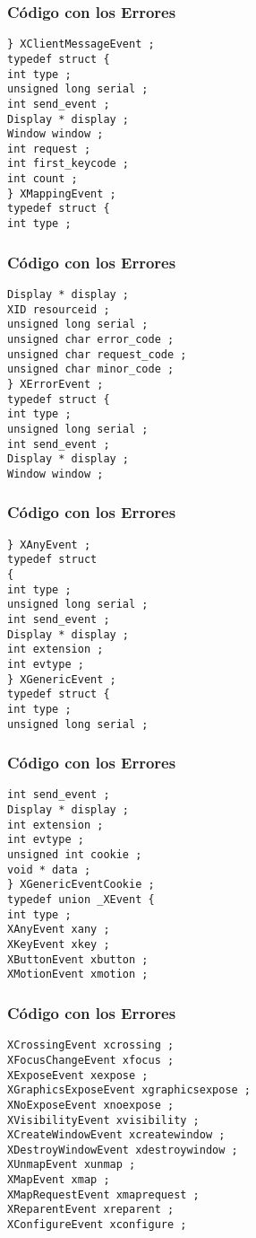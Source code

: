\documentclass{beamer}
\begin{document}
\begin{frame}[fragile]
\frametitle{C\'odigo con los Errores}
\begin{verbatim}
} XClientMessageEvent ; 
typedef struct { 
int type ; 
unsigned long serial ; 
int send_event ; 
Display * display ; 
Window window ; 
int request ; 
int first_keycode ; 
int count ; 
} XMappingEvent ; 
typedef struct { 
int type ; 
\end{verbatim}
\end{frame}
\begin{frame}[fragile]
\frametitle{C\'odigo con los Errores}
\begin{verbatim}
Display * display ; 
XID resourceid ; 
unsigned long serial ; 
unsigned char error_code ; 
unsigned char request_code ; 
unsigned char minor_code ; 
} XErrorEvent ; 
typedef struct { 
int type ; 
unsigned long serial ; 
int send_event ; 
Display * display ; 
Window window ; 
\end{verbatim}
\end{frame}
\begin{frame}[fragile]
\frametitle{C\'odigo con los Errores}
\begin{verbatim}
} XAnyEvent ; 
typedef struct 
{ 
int type ; 
unsigned long serial ; 
int send_event ; 
Display * display ; 
int extension ; 
int evtype ; 
} XGenericEvent ; 
typedef struct { 
int type ; 
unsigned long serial ; 
\end{verbatim}
\end{frame}
\begin{frame}[fragile]
\frametitle{C\'odigo con los Errores}
\begin{verbatim}
int send_event ; 
Display * display ; 
int extension ; 
int evtype ; 
unsigned int cookie ; 
void * data ; 
} XGenericEventCookie ; 
typedef union _XEvent { 
int type ; 
XAnyEvent xany ; 
XKeyEvent xkey ; 
XButtonEvent xbutton ; 
XMotionEvent xmotion ; 
\end{verbatim}
\end{frame}
\begin{frame}[fragile]
\frametitle{C\'odigo con los Errores}
\begin{verbatim}
XCrossingEvent xcrossing ; 
XFocusChangeEvent xfocus ; 
XExposeEvent xexpose ; 
XGraphicsExposeEvent xgraphicsexpose ; 
XNoExposeEvent xnoexpose ; 
XVisibilityEvent xvisibility ; 
XCreateWindowEvent xcreatewindow ; 
XDestroyWindowEvent xdestroywindow ; 
XUnmapEvent xunmap ; 
XMapEvent xmap ; 
XMapRequestEvent xmaprequest ; 
XReparentEvent xreparent ; 
XConfigureEvent xconfigure ; 
\end{verbatim}
\end{frame}
\end{document}

